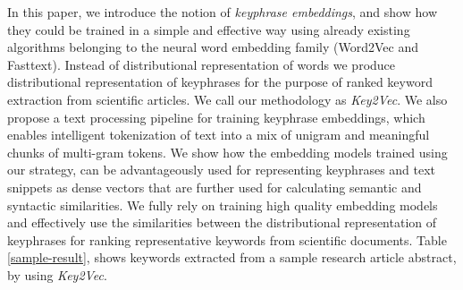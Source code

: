 \documentclass[conference]{IEEEtran}
\begin{document}
In this paper, we introduce the notion of \textit{keyphrase embeddings}, and show how they could be trained in a simple and effective way using already existing algorithms belonging to the neural word embedding family (Word2Vec and Fasttext). Instead of distributional representation of words we produce distributional representation of keyphrases for the purpose of ranked keyword extraction from scientific articles. We call our methodology as \textit{Key2Vec}. We also propose a text processing pipeline for training keyphrase embeddings, which enables intelligent tokenization of text into a mix of unigram and meaningful chunks of multi-gram tokens. We show how the embedding models trained using our strategy, can be advantageously used for representing keyphrases and text snippets as dense vectors that are further used for calculating semantic and syntactic similarities. We fully rely on training high quality embedding models and effectively use the similarities between the distributional representation of keyphrases for ranking representative keywords from scientific documents. Table \ref{sample-result}, shows keywords extracted from a sample research article abstract, by using \textit{Key2Vec}.  

\begin{table}[htbp]
\footnotesize
\centering
\caption{\small Keywords extracted by using \textit{Key2Vec} from a sample research article abstract.}
\tabcolsep=0.10cm
\label{sample-result}
\end{table}
\end{document}
